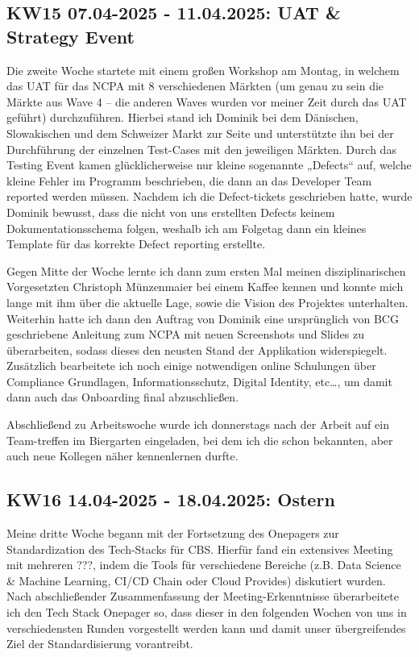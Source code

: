 \subsection{KW15 07.04-2025 - 11.04.2025: UAT \& Strategy Event}
Die zweite Woche startete mit einem großen Workshop am Montag, in welchem das \ac{UAT} für das \ac{NCPA} mit 8 verschiedenen Märkten (um genau zu sein die Märkte aus Wave 4 – die anderen Waves wurden vor meiner Zeit durch das \ac{UAT} geführt) durchzuführen. 
Hierbei stand ich Dominik bei dem Dänischen, Slowakischen und dem Schweizer Markt zur Seite und unterstützte ihn bei der Durchführung der einzelnen Test-Cases mit den jeweiligen Märkten. 
Durch das Testing Event kamen glücklicherweise nur kleine sogenannte „Defects“ auf, welche kleine Fehler im Programm beschrieben, die dann an das Developer Team reported werden müssen. 
Nachdem ich die Defect-tickets geschrieben hatte, wurde Dominik bewusst, dass die nicht von uns erstellten Defects keinem Dokumentationsschema folgen, weshalb ich am Folgetag dann ein kleines Template für das korrekte Defect reporting erstellte.

Gegen Mitte der Woche lernte ich dann zum ersten Mal meinen disziplinarischen Vorgesetzten Christoph Münzenmaier bei einem Kaffee kennen und konnte mich lange mit ihm über die aktuelle Lage, sowie die Vision des Projektes unterhalten. 
Weiterhin hatte ich dann den Auftrag von Dominik eine ursprünglich von BCG geschriebene Anleitung zum \ac{NCPA} mit neuen Screenshots und Slides zu überarbeiten, sodass dieses den neusten Stand der Applikation widerspiegelt. 
Zusätzlich bearbeitete ich noch einige notwendigen online Schulungen über Compliance Grundlagen, Informationsschutz, Digital Identity, etc…, um damit dann auch das Onboarding final abzuschließen.

Abschließend zu Arbeitswoche wurde ich donnerstags nach der Arbeit auf ein Team-treffen im Biergarten eingeladen, bei dem ich die schon bekannten, aber auch neue Kollegen näher kennenlernen durfte.


\subsection{KW16 14.04-2025 - 18.04.2025: Ostern}
Meine dritte Woche begann mit der Fortsetzung des Onepagers zur Standardization des Tech-Stacks für \ac{CBS}. 
Hierfür fand ein extensives Meeting mit mehreren ???, indem die Tools für verschiedene Bereiche (z.B. Data Science \& Machine Learning, CI/CD Chain oder Cloud Provides) diskutiert wurden. 
Nach abschließender Zusammenfassung der Meeting-Erkenntnisse überarbeitete ich den Tech Stack Onepager so, dass dieser in den folgenden Wochen von uns in verschiedensten Runden vorgestellt werden kann und damit unser übergreifendes Ziel der Standardisierung vorantreibt.

